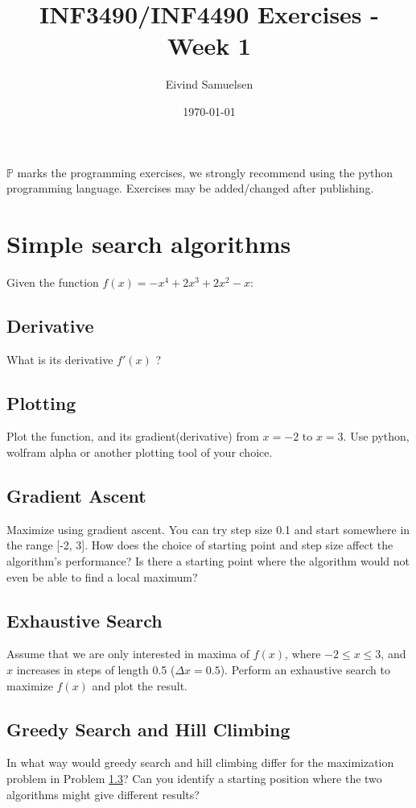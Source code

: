 \documentclass{article}           %
\title{\vspace{-2cm}INF3490/INF4490 Exercises - Week 1}
\author{Eivind Samuelsen}
\date{\today}
\newcommand\marginsymbol[1][0pt]{%
    \tabto*{0cm}\makebox[\dimexpr-1cm-#1\relax][r]{$\mathbb{P}$}\tabto*{\TabPrevPos}}
\begin{document}
    \renewcommand\marginsymbol[1][0pt]{%
  \tabto*{0cm}\makebox[-1cm][c]{$\mathbb{P}$}\tabto*{\TabPrevPos}}

\maketitle
\(\mathbb{P}\) marks the programming exercises,
we strongly recommend using the python programming language.
Exercises may be added/changed after publishing.

\section{Simple search algorithms}

Given the function \(f(x) = -x^4 + 2x^3 + 2x^2 - x\):

\subsection{Derivative}
What is its derivative \(f'(x)\) ?

\subsection{Plotting \marginsymbol}
Plot the function, and its gradient(derivative) from \(x=-2\) to \(x=3\).
Use python, wolfram alpha or another plotting tool of your choice.

\subsection{Gradient Ascent \marginsymbol}
\label{subsec:grada}
Maximize using gradient ascent.
You can try step size 0.1 and start somewhere in the range [-2, 3].
How does the choice of starting point and step size affect the algorithm's performance?
Is there a starting point where the algorithm would not even be able to find a local maximum?

\subsection{Exhaustive Search \marginsymbol}
\label{subsec:exhaust}
Assume that we are only interested in maxima of \(f(x)\),
where \(-2\leq x \leq 3\),
and \(x\) increases in steps of length 0.5 (\(\Delta x = 0.5\)).
Perform an exhaustive search to maximize \(f(x)\) and plot the result.

\subsection{Greedy Search and Hill Climbing}
In what way would greedy search and hill climbing differ for the maximization problem in Problem \ref{subsec:grada}?
Can you identify a starting position where the two algorithms might give different results?
\end{document}
